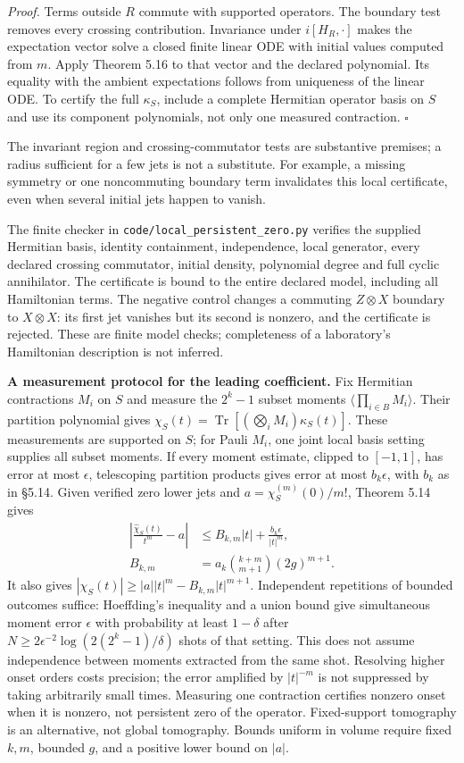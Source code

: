 \documentclass[
  11pt,
]{article}
\begin{document}
\emph{Proof.} Terms outside \(R\) commute with supported operators. The boundary
test removes every crossing contribution. Invariance under \(i[H_R,\cdot]\)
makes the expectation vector solve a closed finite linear ODE with initial
values computed from \(m\). Apply Theorem 5.16 to that vector and the declared
polynomial. Its equality with the ambient expectations follows from
uniqueness of the linear ODE. To certify the full \(\kappa_S\), include a
complete Hermitian operator basis on \(S\) and use its component polynomials,
not only one measured contraction. \(\square\)

The invariant region and crossing-commutator tests are substantive premises;
a radius sufficient for a few jets is not a substitute. For example, a
missing symmetry or one noncommuting boundary term invalidates this local
certificate, even when several initial jets happen to vanish.

The finite checker in \texttt{code/local\_persistent\_zero.py} verifies the supplied
Hermitian basis, identity containment, independence, local generator, every
declared crossing commutator, initial density, polynomial degree and full
cyclic annihilator. The certificate is bound to the entire declared model,
including all Hamiltonian terms. The negative control changes a commuting
\(Z\otimes X\) boundary to \(X\otimes X\): its first jet vanishes but its second
is nonzero, and the certificate is rejected. These are finite model checks;
completeness of a laboratory's Hamiltonian description is not inferred.

\textbf{A measurement protocol for the leading coefficient.} Fix Hermitian
contractions \(M_i\) on \(S\) and measure the \(2^k-1\) subset moments
\(\langle\prod_{i\in B}M_i\rangle\). Their partition polynomial gives
\(\chi_S(t)=\operatorname{Tr}[(\bigotimes_iM_i)\kappa_S(t)]\). These
measurements are supported on \(S\); for Pauli \(M_i\), one joint local basis
setting supplies all subset moments. If every moment estimate, clipped to
\([-1,1]\), has error at most \(\epsilon\), telescoping partition products
gives error at most \(b_k\epsilon\), with \(b_k\) as in §5.14.
Given verified zero lower jets and \(a=\chi_S^{(m)}(0)/m!\), Theorem 5.14 gives
\[
 \begin{aligned}
 \left|\frac{\widehat\chi_S(t)}{t^m}-a\right|
 &\le B_{k,m}|t|+\frac{b_k\epsilon}{|t|^m},\\
 B_{k,m}&=a_k\binom{k+m}{m+1}(2g)^{m+1}.
 \end{aligned}
\]
It also gives \(|\chi_S(t)|\ge |a||t|^m-B_{k,m}|t|^{m+1}\).
Independent repetitions of bounded outcomes suffice: Hoeffding's inequality
and a union bound give simultaneous moment error \(\epsilon\) with probability
at least \(1-\delta\) after
\(N\ge2\epsilon^{-2}\log(2(2^k-1)/\delta)\) shots of that setting.
This does not assume independence between moments extracted from the same
shot. Resolving higher onset orders costs precision; the error amplified by
\(|t|^{-m}\) is not suppressed by taking arbitrarily small times. Measuring
one contraction certifies nonzero onset when it is nonzero, not persistent
zero of the operator. Fixed-support tomography is an alternative, not global
tomography. Bounds uniform in volume require fixed \(k,m\), bounded \(g\), and
a positive lower bound on \(|a|\).
\end{document}
